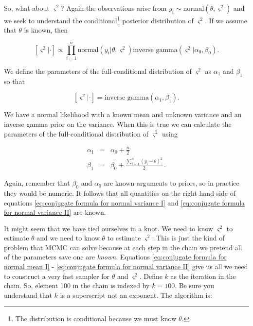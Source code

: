\documentclass[11pt]{article}
\begin{document}
So, what about $\varsigma^{2}$? Again the observations arise from $y_{i}\sim\text{normal}\left(\theta,\varsigma^{2}\right)$ and we seek to understand the conditional\footnote{The distribution is conditional because we must know $\theta.$} posterior distribution of $\varsigma^{2}$. If we assume that $\theta$ is known, then 

\begin{equation}
\left[\varsigma^{2}|\cdot\right]\propto\prod_{i=1}^{n}\text{normal}\left(y_{i}|\theta,\varsigma^{2}\right)\text{inverse gamma}\left(\varsigma^{2}|\alpha_{0},\beta_{0}\right).\label{eq:posterior distribution of var sigma}
\end{equation}

We define the parameters of the full-conditional distribution of $\varsigma^{2}$ as $\alpha_{1}$ and $\beta_{1}$ so that

\begin{equation}
\left[\varsigma^{2}|\cdot\right]=\text{inverse gamma}\left(\alpha_{1},\beta_{1}\right).
\end{equation}

We have a normal likelihood with a known mean and unknown variance and an inverse gamma prior on the variance. When this is true we can calculate the parameters of the full-conditional distribution of $\varsigma^{2}$ using 

\begin{eqnarray}
\alpha_{1} & = & \alpha_{0}+\frac{n}{2}\label{eq:conjugate formula for normal variance I}\\
\beta_{1} & = & \beta_{0}+\frac{\sum_{i=1}^{n}{(y_{i}-\theta)^{2}}}{2}\,.\label{eq:conjugate formula for normal variance II}
\end{eqnarray}

Again, remember that $\beta_{0}$ and $\alpha_{0}$ are known arguments to priors, so in practice they would be numeric. It follows that all quantities on the right hand side of equations \ref{eq:conjugate formula for normal variance I} and \ref{eq:conjugate formula for normal variance II} are known. 

It might seem that we have tied ourselves in a knot. We need to know $\varsigma^{2}$ to estimate $\theta$ and we need to know $\theta$ to estimate $\varsigma^{2}.$ This is just the kind of problem that MCMC can solve because at each step in the chain we pretend all of the parameters save one are \emph{known}. Equations \ref{eq:conjugate formula for normal mean I} - \ref{eq:conjugate formula for normal variance II} give us all we need to construct a very fast sampler for $\theta$ and $\varsigma^{2}$. Define $k$ as the iteration in the chain. So, element 100 in the chain is indexed by $k=100$. Be sure you understand that $k$ is a superscript not an exponent. The algorithm is:
\end{document}
